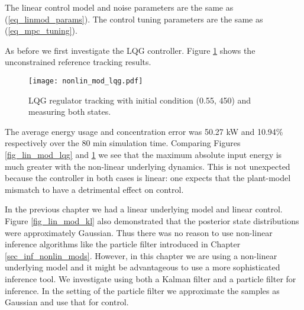 The linear control model and noise parameters are the same as (\ref{eq_linmod_params}). The control tuning parameters are the same as (\ref{eq_mpc_tuning}).

As before we first investigate the LQG controller. Figure \ref{fig_nonlin_lqg} shows the unconstrained reference tracking results.
\begin{figure}[H] 
\centering
\texttt{[image: nonlin\_mod\_lqg.pdf]}
\caption{LQG regulator tracking with initial condition (0.55, 450) and measuring both states.}
\label{fig_nonlin_lqg}
\end{figure}
The average energy usage and concentration error was 50.27 kW and 10.94\% respectively over the 80 min simulation time. Comparing Figures \ref{fig_lin_mod_lqg} and \ref{fig_nonlin_lqg} we see that the maximum absolute input energy is much greater with the non-linear underlying dynamics. This is not unexpected because the controller in both cases is linear: one expects that the plant-model mismatch to have a detrimental effect on control.

In the previous chapter we had a linear underlying model and linear control. Figure \ref{fig_lin_mod_kl} also demonstrated that the posterior state distributions were approximately Gaussian. Thus there was no reason to use non-linear inference algorithms like the particle filter introduced in Chapter \ref{sec_inf_nonlin_mods}. However, in this chapter we are using a non-linear underlying model and it might be advantageous to use a more sophisticated inference tool. We investigate using both a Kalman filter and a particle filter for inference. In the setting of the particle filter we approximate the samples as Gaussian and use that for control.

